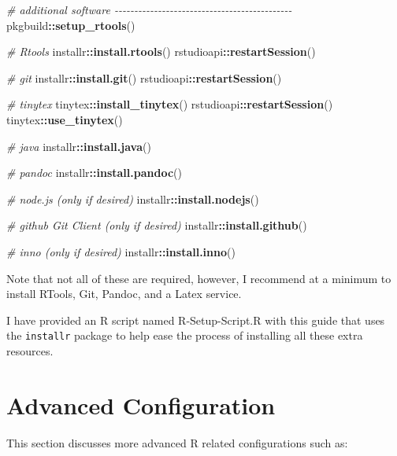 \documentclass[
]{book}
\newenvironment{Shaded}{\begin{snugshade}}{\end{snugshade}}
\newcommand{\CommentTok}[1]{\textcolor[rgb]{0.56,0.35,0.01}{\textit{#1}}}
\newcommand{\KeywordTok}[1]{\textcolor[rgb]{0.13,0.29,0.53}{\textbf{#1}}}
\newcommand{\NormalTok}[1]{#1}
\newcommand{\OperatorTok}[1]{\textcolor[rgb]{0.81,0.36,0.00}{\textbf{#1}}}
\begin{document}
\begin{Shaded}
\begin{Highlighting}[]
\CommentTok{\# additional software {-}{-}{-}{-}{-}{-}{-}{-}{-}{-}{-}{-}{-}{-}{-}{-}{-}{-}{-}{-}{-}{-}{-}{-}{-}{-}{-}{-}{-}{-}{-}{-}{-}{-}{-}{-}{-}{-}{-}{-}{-}{-}{-}{-}{-}}
\NormalTok{pkgbuild}\OperatorTok{::}\KeywordTok{setup\_rtools}\NormalTok{()}

\CommentTok{\# Rtools}
\NormalTok{installr}\OperatorTok{::}\KeywordTok{install.rtools}\NormalTok{()}
\NormalTok{rstudioapi}\OperatorTok{::}\KeywordTok{restartSession}\NormalTok{()}

\CommentTok{\# git}
\NormalTok{installr}\OperatorTok{::}\KeywordTok{install.git}\NormalTok{()}
\NormalTok{rstudioapi}\OperatorTok{::}\KeywordTok{restartSession}\NormalTok{()}

\CommentTok{\# tinytex}
\NormalTok{tinytex}\OperatorTok{::}\KeywordTok{install\_tinytex}\NormalTok{()}
\NormalTok{rstudioapi}\OperatorTok{::}\KeywordTok{restartSession}\NormalTok{()}
\NormalTok{tinytex}\OperatorTok{::}\KeywordTok{use\_tinytex}\NormalTok{()}

\CommentTok{\# java}
\NormalTok{installr}\OperatorTok{::}\KeywordTok{install.java}\NormalTok{()}

\CommentTok{\# pandoc}
\NormalTok{installr}\OperatorTok{::}\KeywordTok{install.pandoc}\NormalTok{()}

\CommentTok{\# node.js (only if desired)}
\NormalTok{installr}\OperatorTok{::}\KeywordTok{install.nodejs}\NormalTok{()}

\CommentTok{\# github Git Client (only if desired)}
\NormalTok{installr}\OperatorTok{::}\KeywordTok{install.github}\NormalTok{()}

\CommentTok{\# inno (only if desired)}
\NormalTok{installr}\OperatorTok{::}\KeywordTok{install.inno}\NormalTok{()}
\end{Highlighting}
\end{Shaded}

Note that not all of these are required, however, I recommend at a minimum to
install RTools, Git, Pandoc, and a Latex service.

I have provided an R script named R-Setup-Script.R with this guide that uses the
\texttt{installr} package to help ease the process of installing all these extra
resources.

\hypertarget{advanced-configuration}{%
\section{Advanced Configuration}\label{advanced-configuration}}

This section discusses more advanced R related configurations such as:
\end{document}
